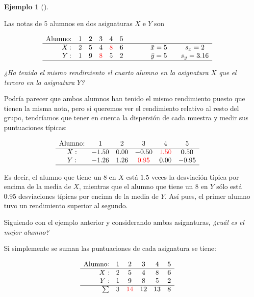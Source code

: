 \documentclass[
  spanish,
  a4paper,
]{scrreport}
\theoremstyle{plain}
\theoremstyle{definition}
\newtheorem{example}{Ejemplo}[chapter]
\theoremstyle{definition}
\theoremstyle{remark}
\begin{document}
\begin{example}[]\protect\hypertarget{exm-tipificacion}{}\label{exm-tipificacion}

Las notas de 5 alumnos en dos asignaturas \(X\) e \(Y\) son

\[
\begin{array}{rccccccccc}
\mbox{Alumno:} & 1 & 2 & 3 & 4 & 5\\
\hline
X: & 2 & 5 & 4 & \color{red} 8 & 6 & \qquad & \bar x = 5 & \quad s_x = 2\\
Y: & 1 & 9 & \color{red} 8 & 5 & 2 & \qquad & \bar y = 5 & \quad s_y = 3.16\\
\hline
\end{array}
\]

\emph{¿Ha tenido el mismo rendimiento el cuarto alumno en la asignatura
\(X\) que el tercero en la asignatura \(Y\)?}

Podría parecer que ambos alumnos han tenido el mismo rendimiento puesto
que tienen la misma nota, pero si queremos ver el rendimiento relativo
al resto del grupo, tendríamos que tener en cuenta la dispersión de cada
muestra y medir sus puntuaciones típicas:

\[
\begin{array}{cccccc}
\mbox{Alumno:} & 1 & 2 & 3 & 4 & 5\\
\hline
X: & -1.50 & 0.00 & -0.50 & \color{red}{1.50} & 0.50 \\
Y: & -1.26 & 1.26 & \color{red}{0.95} & 0.00 & -0.95\\
\hline
\end{array}
\]

Es decir, el alumno que tiene un 8 en \(X\) está \(1.5\) veces la
desviación típica por encima de la media de \(X\), mientras que el
alumno que tiene un 8 en \(Y\) sólo está \(0.95\) desviaciones típicas
por encima de la media de \(Y\). Así pues, el primer alumno tuvo un
rendimiento superior al segundo.

Siguiendo con el ejemplo anterior y considerando ambas asignaturas,
\emph{¿cuál es el mejor alumno?}

Si simplemente se suman las puntuaciones de cada asignatura se tiene:

\[\begin{array}{rccccc}
\mbox{Alumno:} & 1 & 2 & 3 & 4 & 5\\
\hline
X: & 2 & 5 & 4 & 8 & 6 \\
Y: & 1 & 9 & 8 & 5 & 2 \\
\hline
\sum & 3 & \color{red}{14} & 12 & 13 & 8
\end{array}
\]


\end{example}
\end{document}
